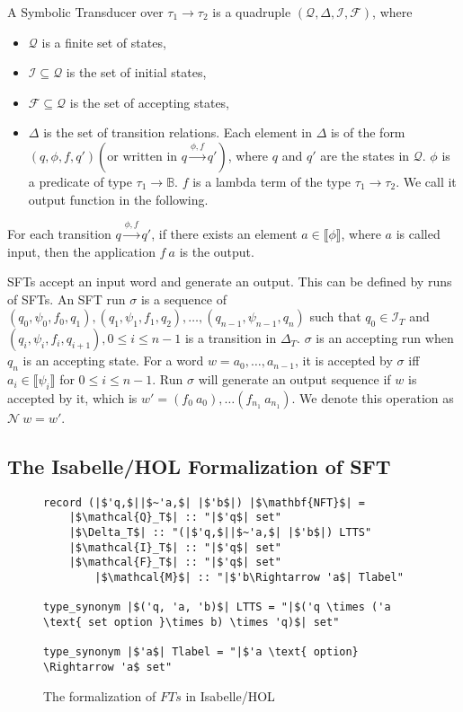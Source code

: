 \documentclass[a4paper,UKenglish,cleveref, autoref, thm-restate]{lipics-v2021}
\begin{document}
\begin{definition}
\label{def-sft}
   A Symbolic Transducer over $\tau_1\rightarrow \tau_2$ is a quadruple $(\mathcal{Q}, \Delta, \mathcal{I}, \mathcal{F})$, where 
   \begin{itemize}
   \item $\mathcal{Q}$ is a finite set of states,
   \item $\mathcal{I}\subseteq \mathcal{Q}$ is the set of initial states,
   \item $\mathcal{F} \subseteq\mathcal{Q}$ is the set of accepting states,
   \item $\Delta$ is the set of transition relations. Each element in $\Delta$ is of the form $(q, \phi, f, q') (\text{or written in } q\xrightarrow{\phi, f} q')$, where $q$ and $q'$ are the states in $\mathcal{Q}$.
   $\phi$ is a predicate of type $\tau_1\rightarrow \mathbb{B}$.
   $f$ is a lambda term of the type $\tau_1\rightarrow \tau_2$. We call it output function in the following.
   \end{itemize}

For each transition $q\xrightarrow{\phi, f} q'$, if there exists an element $a\in \llbracket \phi \rrbracket$, where $a$ is called input,  then the application $f~a$ is the output.
   
\end{definition}

SFTs accept an input word and generate an output. This can be defined by runs of SFTs.
An SFT run $\sigma$ is a sequence of $(q_0, \psi_0, f_0, q_1),(q_1, \psi_1, f_1, q_2),\ldots, (q_{n-1}, \psi_{n-1}, q_n)$ such that $q_0\in \mathcal{I}_T$ and $(q_i, 
\psi_i, f_i, q_{i+1}), 0 \leq i \leq n-1$ is a transition in $\Delta_T$.
$\sigma$ is an accepting run when $q_n$ is an accepting state.
For a word $w = a_0,\ldots, a_{n-1}$, it is accepted by $\sigma$ iff $a_i \in \llbracket\psi_i \rrbracket$ for $0 \leq i \leq n - 1$. Run $\sigma$ will generate an output sequence if $w$ is accepted by it, which is $w'= (f_0~a_0), \ldots (f_{n_1}~a_{n_1})$. We denote this operation as $\mathcal{N}~w = w'$.


\subsection{The Isabelle/HOL Formalization of SFT}

\begin{figure}[t]
	\begin{lstlisting}
record (|$'q,$||$~'a,$| |$'b$|) |$\mathbf{NFT}$| =
	|$\mathcal{Q}_T$| :: "|$'q$| set"
	|$\Delta_T$| :: "(|$'q,$||$~'a,$| |$'b$|) LTTS"
	|$\mathcal{I}_T$| :: "|$'q$| set"
	|$\mathcal{F}_T$| :: "|$'q$| set"
        |$\mathcal{M}$| :: "|$'b\Rightarrow 'a$| Tlabel"
        
type_synonym |$('q, 'a, 'b)$| LTTS = "|$('q \times ('a \text{ set option }\times b) \times 'q)$| set"

type_synonym |$'a$| Tlabel = "|$'a \text{ option} \Rightarrow 'a$ set"
	\end{lstlisting}
\caption{The formalization of $FTs$ in Isabelle/HOL}
\label{fig-def-FT}
\end{figure}
\end{document}
